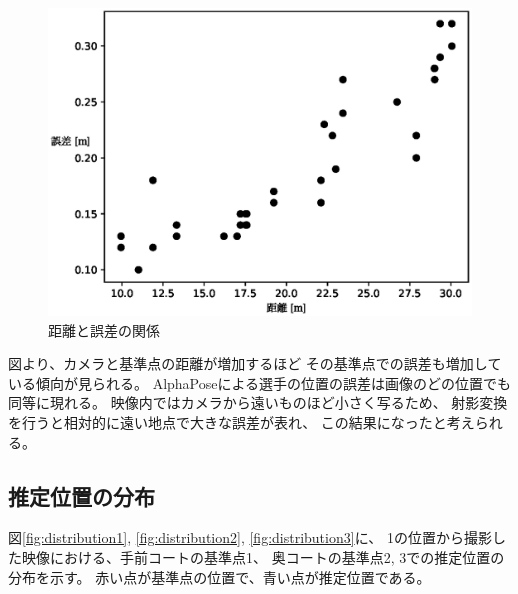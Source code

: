\documentclass[a4j, fleqn, 12pt]{jsreport}
\begin{document}
            \begin{figure}[ht]
                \centering
                \includegraphics[width=0.8\hsize]{images/scat.eps}
                \caption{距離と誤差の関係}
                \label{fig:graph}
            \end{figure}

            図より、カメラと基準点の距離が増加するほど
            その基準点での誤差も増加している傾向が見られる。
            AlphaPoseによる選手の位置の誤差は画像のどの位置でも同等に現れる。
            映像内ではカメラから遠いものほど小さく写るため、
            射影変換を行うと相対的に遠い地点で大きな誤差が表れ、
            この結果になったと考えられる。

        \subsection{推定位置の分布} \label{subsec:distribution}
            図\ref{fig:distribution1}, \ref{fig:distribution2}, \ref{fig:distribution3}に、
            1の位置から撮影した映像における、手前コートの基準点1、
            奥コートの基準点2, 3での推定位置の分布を示す。
            赤い点が基準点の位置で、青い点が推定位置である。
\end{document}
